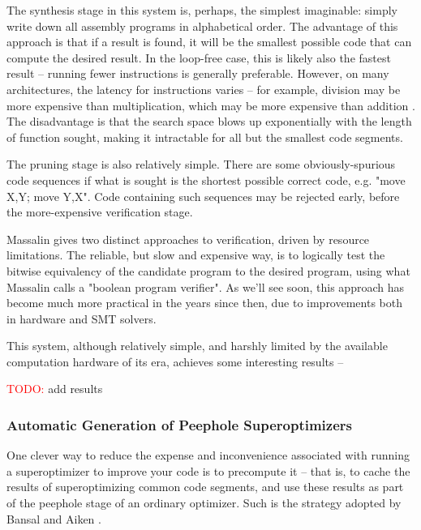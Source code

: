 \documentclass[12pt,twoside]{reedthesis}
\newcommand{\red}[1]{\textcolor{red}{#1}}
\newcommand{\addressed}[2]{{#1}}
\begin{document}
The synthesis stage in this system is, perhaps, the simplest imaginable: simply write down all assembly programs in alphabetical order.
The advantage of this approach is that if a result is found, it will be the smallest possible code that can compute the desired result.
In the loop-free case, this is likely also the fastest result -- running fewer instructions is generally preferable.
However, on many architectures, the latency for instructions varies -- for example, division may be more expensive than multiplication, which may be more expensive than addition \cite{fog1996instructiontables}.
The disadvantage is that the search space blows up exponentially with the length of function sought, making it intractable for all but the smallest code segments.
    
The pruning stage is also relatively simple.
There are some obviously-spurious code sequences if what is sought is the shortest possible correct code, e.g. "move X,Y; move Y,X".
Code containing such sequences may be rejected early, before the more-expensive verification stage.
    
Massalin gives two distinct approaches to verification, driven by resource limitations.
The reliable, but slow and expensive way, is to logically test the bitwise equivalency of the candidate program to the desired program, using what Massalin calls a "boolean program verifier".
As we'll see soon, this approach has become much more practical in the years since then, due to improvements both in hardware and SMT solvers. 
    
This system, although relatively simple, and harshly limited by the available computation hardware of its era, achieves some interesting results --
    
\red{TODO:} add results %

\subsubsection{Automatic Generation of Peephole Superoptimizers}
One clever way to reduce the expense and inconvenience associated with running a superoptimizer to improve your code is to precompute it
-- that is, to cache the results of superoptimizing common code segments, and use these results as part of the peephole stage of an ordinary optimizer.
Such is the strategy adopted by Bansal and Aiken \cite{bansal2006peephole}.
    
\end{document}
